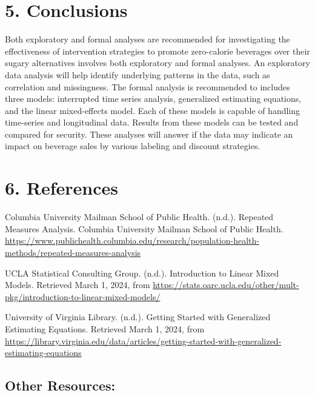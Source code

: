 \documentclass[
]{article}
\begin{document}
\hypertarget{conclusions}{%
\section{5. Conclusions}\label{conclusions}}

Both exploratory and formal analyses are recommended for investigating the effectiveness of intervention strategies to promote zero-calorie beverages over their sugary alternatives involves both exploratory and formal analyses. An exploratory data analysis will help identify underlying patterns in the data, such as correlation and missingness. The formal analysis is recommended to includes three models: interrupted time series analysis, generalized estimating equations, and the linear mixed-effects model. Each of these models is capable of handling time-series and longitudinal data. Results from these models can be tested and compared for security. These analyses will answer if the data may indicate an impact on beverage sales by various labeling and discount strategies.

\pagebreak

\hypertarget{references}{%
\section{6. References}\label{references}}

Columbia University Mailman School of Public Health. (n.d.). Repeated Measures Analysis. Columbia University Mailman School of Public Health. \url{https://www.publichealth.columbia.edu/research/population-health-methods/repeated-measures-analysis}

UCLA Statistical Consulting Group. (n.d.). Introduction to Linear Mixed Models. Retrieved March 1, 2024, from \url{https://stats.oarc.ucla.edu/other/mult-pkg/introduction-to-linear-mixed-models/}

University of Virginia Library. (n.d.). Getting Started with Generalized Estimating Equations. Retrieved March 1, 2024, from \url{https://library.virginia.edu/data/articles/getting-started-with-generalized-estimating-equations}

\hypertarget{other-resources}{%
\subsection{Other Resources:}\label{other-resources}}
\end{document}
